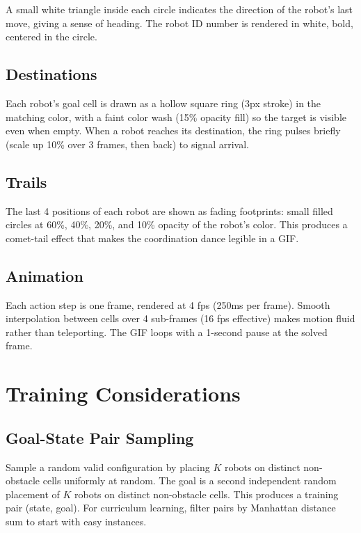 \documentclass[11pt]{article}
\begin{document}
A small white triangle inside each circle indicates the direction of the robot's last move, giving a sense of heading. The robot ID number is rendered in white, bold, centered in the circle.

\subsection{Destinations}

Each robot's goal cell is drawn as a hollow square ring (3px stroke) in the matching color, with a faint color wash (15\% opacity fill) so the target is visible even when empty. When a robot reaches its destination, the ring pulses briefly (scale up 10\% over 3 frames, then back) to signal arrival.

\subsection{Trails}

The last 4 positions of each robot are shown as fading footprints: small filled circles at 60\%, 40\%, 20\%, and 10\% opacity of the robot's color. This produces a comet-tail effect that makes the coordination dance legible in a GIF.

\subsection{Animation}

Each action step is one frame, rendered at 4 fps (250ms per frame). Smooth interpolation between cells over 4 sub-frames (16 fps effective) makes motion fluid rather than teleporting. The GIF loops with a 1-second pause at the solved frame.

\section{Training Considerations}

\subsection{Goal-State Pair Sampling}

Sample a random valid configuration by placing $K$ robots on distinct non-obstacle cells uniformly at random. The goal is a second independent random placement of $K$ robots on distinct non-obstacle cells. This produces a training pair (state, goal). For curriculum learning, filter pairs by Manhattan distance sum to start with easy instances.
\end{document}
